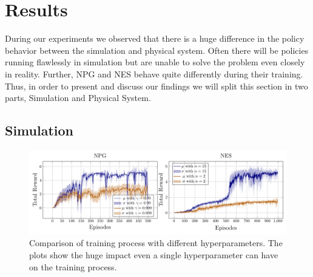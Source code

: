 \section{Results}
\label{results}
During our experiments we observed that there is a huge difference in the policy behavior between the simulation and physical system. Often there will be policies running flawlessly in simulation but are unable to solve the problem even closely in reality. Further, NPG and NES behave quite differently during their training. Thus, in order to present and discuss our findings we will split this section in two parts, Simulation and Physical System.

\subsection{Simulation}
\label{sim}

\begin{figure}
\centering
\includegraphics[scale=.5]{plots/qube_compare.pdf}
\caption{Comparison of training process with different hyperparameters. The plots show the huge impact even a single hyperparameter can have on the training process.}
\label{fig:NPG_training}
\end{figure}

